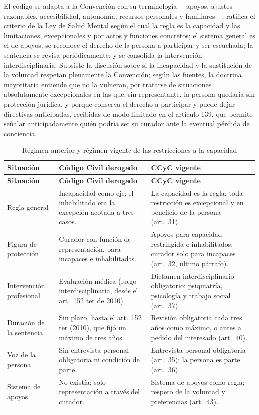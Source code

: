\documentclass[12pt,oneside]{book}
\begin{document}
El código se adapta a la Convención con su terminología ---apoyos, ajustes razonables, accesibilidad, autonomía, recursos personales y familiares---; ratifica el criterio de la Ley de Salud Mental según el cual la regla es la capacidad y las limitaciones, excepcionales y por actos y funciones concretos; el sistema general es el de apoyos; se reconoce el derecho de la persona a participar y ser escuchada; la sentencia se revisa periódicamente; y se consolida la intervención interdisciplinaria. Subsiste la discusión sobre si la incapacidad y la sustitución de la voluntad respetan plenamente la Convención; según las fuentes, la doctrina mayoritaria entiende que no la vulneran, por tratarse de situaciones absolutamente excepcionales en las que, sin representante, la persona quedaría sin protección jurídica, y porque conserva el derecho a participar y puede dejar directivas anticipadas, recibidas de modo limitado en el artículo 139, que permite señalar anticipadamente quién podría ser su curador ante la eventual pérdida de conciencia.

\begin{longtable}{@{}B{0.18\textwidth}L{0.35\textwidth}L{0.35\textwidth}@{}}
\toprule
\textbf{Situación} & \textbf{Código Civil derogado} & \textbf{CCyC vigente} \\
\midrule
\endfirsthead
\toprule
\textbf{Situación} & \textbf{Código Civil derogado} & \textbf{CCyC vigente} \\
\midrule
\endhead
\bottomrule
\endfoot
Regla general & Incapacidad como eje; el inhabilitado era la excepción acotada a tres casos. & La capacidad es la regla; toda restricción es excepcional y en beneficio de la persona (art.~31). \\
Figura de protección & Curador con función de representación, para incapaces e inhabilitados. & Apoyos para capacidad restringida e inhabilitados; curador solo para incapaces (art.~32, último párrafo). \\
Intervención profesional & Evaluación médica (luego interdisciplinaria, desde el art.~152 ter de 2010). & Dictamen interdisciplinario obligatorio: psiquiatría, psicología y trabajo social (art.~37). \\
Duración de la sentencia & Sin plazo, hasta el art.~152 ter (2010), que fijó un máximo de tres años. & Revisión obligatoria cada tres años como máximo, o antes a pedido del interesado (art.~40). \\
Voz de la persona & Sin entrevista personal obligatoria ni condición de parte. & Entrevista personal obligatoria (art.~35); la persona es parte (art.~36). \\
Sistema de apoyos & No existía; solo representación a través del curador. & Sistema de apoyos como regla; respeto de la voluntad y preferencias (art.~43). \\
\caption{Régimen anterior y régimen vigente de las restricciones a la capacidad}\\
\end{longtable}
\end{document}
